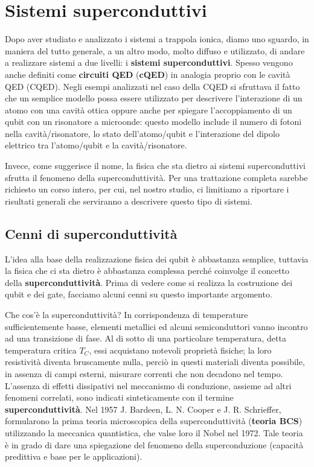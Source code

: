 \vspace{1cm}

\noindent{}
\section{Sistemi superconduttivi}
Dopo aver studiato e analizzato i sistemi a trappola ionica, diamo uno sguardo, in maniera del tutto generale, a un altro modo, molto diffuso e utilizzato, di andare a realizzare sistemi a due livelli: i \textbf{sistemi superconduttivi}. Spesso vengono anche definiti come \textbf{circuiti QED} (\textbf{cQED}) in analogia proprio con le cavità QED (CQED). Negli esempi analizzati nel caso della CQED si sfruttava il fatto che un semplice modello possa essere utilizzato per descrivere l'interazione di un atomo con una cavità ottica oppure anche per spiegare l'accoppiamento di un qubit con un risonatore a microonde: questo modello include il numero di fotoni nella cavità/risonatore, lo stato dell'atomo/qubit e l'interazione del dipolo elettrico tra l'atomo/qubit e la cavità/risonatore.

\noindent Invece, come suggerisce il nome, la fisica che sta dietro ai sistemi superconduttivi sfrutta il fenomeno della superconduttività. Per una trattazione completa sarebbe richiesto un corso intero, per cui, nel nostro studio, ci limitiamo a riportare i risultati generali che serviranno a descrivere questo tipo di sistemi.

\subsection{Cenni di superconduttività}

L'idea alla base della realizzazione fisica dei qubit è abbastanza semplice, tuttavia la fisica che ci sta dietro è abbastanza complessa perché coinvolge il concetto della \textbf{superconduttività}. Prima di vedere come si realizza la costruzione dei qubit e dei gate, facciamo alcuni cenni su questo importante argomento. 

\noindent Che cos'è la superconduttività? In corrispondenza di temperature sufficientemente basse, elementi metallici ed alcuni semiconduttori vanno incontro ad una transizione di fase. Al di sotto di una particolare temperatura, detta temperatura critica $T_C$, essi acquistano notevoli proprietà fisiche; la loro resistività
diventa bruscamente nulla, perciò in questi materiali diventa possibile, in assenza di campi esterni, misurare correnti che non decadono nel tempo. L’assenza di effetti dissipativi nel meccanismo di conduzione, assieme ad altri fenomeni correlati, sono indicati sinteticamente con il termine \textbf{superconduttività}. Nel 1957 J. Bardeen, L. N. Cooper e J. R. Schrieffer, formularono la prima teoria microscopica della superconduttività (\textbf{teoria BCS}) utilizzando la meccanica quantistica, che valse loro il Nobel nel 1972. Tale teoria è in grado di dare una spiegazione del fenomeno della superconduzione (capacità predittiva e base per le applicazioni). 

